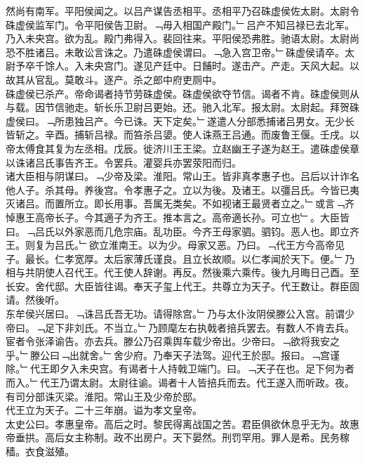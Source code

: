 \documentclass{zhvt-classic}
\begin{document}
\hspace*{2em}然尚有南军。平阳侯闻之。以吕产谋告丞相平。丞相平乃召硃虚侯佐太尉。太尉令硃虚侯监军门。令平阳侯告卫尉。﹁毋入相国产殿门。﹂吕产不知吕禄已去北军。乃入未央宫。欲为乱。殿门弗得入。裴回往来。平阳侯恐弗胜。驰语太尉。太尉尚恐不胜诸吕。未敢讼言诛之。乃遣硃虚侯谓曰。﹁急入宫卫帝。﹂硃虚侯请卒。太尉予卒千馀人。入未央宫门。遂见产廷中。日餔时。遂击产。产走。天风大起。以故其从官乱。莫敢斗。逐产。杀之郎中府吏厕中。\\
\hspace*{2em}硃虚侯已杀产。帝命谒者持节劳硃虚侯。硃虚侯欲夺节信。谒者不肯。硃虚侯则从与载。因节信驰走。斩长乐卫尉吕更始。还。驰入北军。报太尉。太尉起。拜贺硃虚侯曰。﹁所患独吕产。今已诛。天下定矣。﹂遂遣人分部悉捕诸吕男女。无少长皆斩之。辛酉。捕斩吕禄。而笞杀吕嬃。使人诛燕王吕通。而废鲁王偃。壬戌。以帝太傅食其复为左丞相。戊辰。徙济川王王梁。立赵幽王子遂为赵王。遣硃虚侯章以诛诸吕氏事告齐王。令罢兵。灌婴兵亦罢荥阳而归。\\
\hspace*{2em}诸大臣相与阴谋曰。﹁少帝及梁。淮阳。常山王。皆非真孝惠子也。吕后以计诈名他人子。杀其母。养後宫。令孝惠子之。立以为後。及诸王。以彊吕氏。今皆已夷灭诸吕。而置所立。即长用事。吾属无类矣。不如视诸王最贤者立之。﹂或言﹁齐悼惠王高帝长子。今其適子为齐王。推本言之。高帝適长孙。可立也﹂。大臣皆曰。﹁吕氏以外家恶而几危宗庙。乱功臣。今齐王母家驷。驷钧。恶人也。即立齐王。则复为吕氏。﹂欲立淮南王。以为少。母家又恶。乃曰。﹁代王方今高帝见子。最长。仁孝宽厚。太后家薄氏谨良。且立长故顺。以仁孝闻於天下。便。﹂乃相与共阴使人召代王。代王使人辞谢。再反。然後乘六乘传。後九月晦日己酉。至长安。舍代邸。大臣皆往谒。奉天子玺上代王。共尊立为天子。代王数让。群臣固请。然後听。\\
\hspace*{2em}东牟侯兴居曰。﹁诛吕氏吾无功。请得除宫。﹂乃与太仆汝阴侯滕公入宫。前谓少帝曰。﹁足下非刘氏。不当立。﹂乃顾麾左右执戟者掊兵罢去。有数人不肯去兵。宦者令张泽谕告。亦去兵。滕公乃召乘舆车载少帝出。少帝曰。﹁欲将我安之乎。﹂滕公曰﹁出就舍。﹂舍少府。乃奉天子法驾。迎代王於邸。报曰。﹁宫谨除。﹂代王即夕入未央宫。有谒者十人持戟卫端门。曰。﹁天子在也。足下何为者而入。﹂代王乃谓太尉。太尉往谕。谒者十人皆掊兵而去。代王遂入而听政。夜。有司分部诛灭梁。淮阳。常山王及少帝於邸。\\
\hspace*{2em}代王立为天子。二十三年崩。谥为孝文皇帝。\\
\hspace*{2em}太史公曰。孝惠皇帝。高后之时。黎民得离战国之苦。君臣俱欲休息乎无为。故惠帝垂拱。高后女主称制。政不出房户。天下晏然。刑罚罕用。罪人是希。民务稼穑。衣食滋殖。\\
\end{document}
